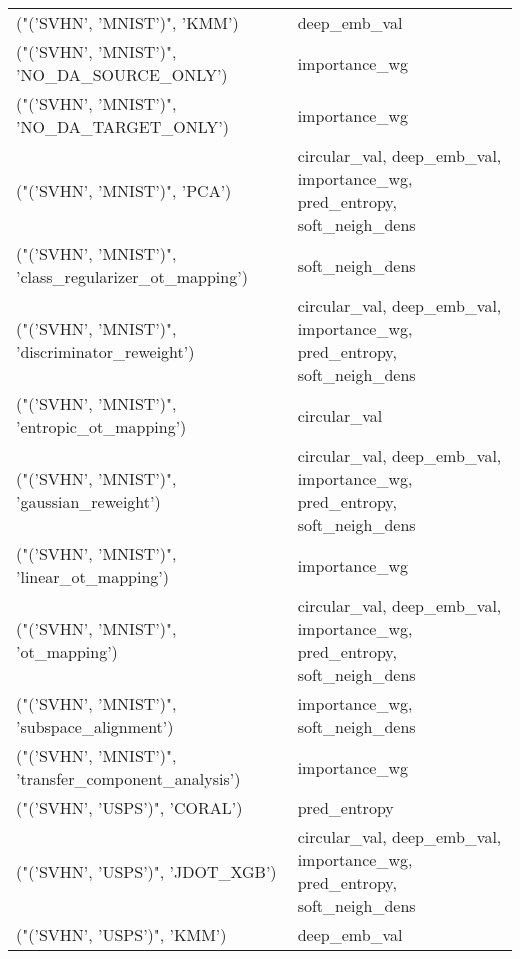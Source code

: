 \begin{tabular}{ll}
 ("('SVHN', 'MNIST')", 'KMM')                          & deep\_emb\_val                                                             \\
 ("('SVHN', 'MNIST')", 'NO\_DA\_SOURCE\_ONLY')            & importance\_wg                                                            \\
 ("('SVHN', 'MNIST')", 'NO\_DA\_TARGET\_ONLY')            & importance\_wg                                                            \\
 ("('SVHN', 'MNIST')", 'PCA')                          & circular\_val, deep\_emb\_val, importance\_wg, pred\_entropy, soft\_neigh\_dens \\
 ("('SVHN', 'MNIST')", 'class\_regularizer\_ot\_mapping') & soft\_neigh\_dens                                                          \\
 ("('SVHN', 'MNIST')", 'discriminator\_reweight')       & circular\_val, deep\_emb\_val, importance\_wg, pred\_entropy, soft\_neigh\_dens \\
 ("('SVHN', 'MNIST')", 'entropic\_ot\_mapping')          & circular\_val                                                             \\
 ("('SVHN', 'MNIST')", 'gaussian\_reweight')            & circular\_val, deep\_emb\_val, importance\_wg, pred\_entropy, soft\_neigh\_dens \\
 ("('SVHN', 'MNIST')", 'linear\_ot\_mapping')            & importance\_wg                                                            \\
 ("('SVHN', 'MNIST')", 'ot\_mapping')                   & circular\_val, deep\_emb\_val, importance\_wg, pred\_entropy, soft\_neigh\_dens \\
 ("('SVHN', 'MNIST')", 'subspace\_alignment')           & importance\_wg, soft\_neigh\_dens                                           \\
 ("('SVHN', 'MNIST')", 'transfer\_component\_analysis')  & importance\_wg                                                            \\
 ("('SVHN', 'USPS')", 'CORAL')                         & pred\_entropy                                                             \\
 ("('SVHN', 'USPS')", 'JDOT\_XGB')                      & circular\_val, deep\_emb\_val, importance\_wg, pred\_entropy, soft\_neigh\_dens \\
 ("('SVHN', 'USPS')", 'KMM')                           & deep\_emb\_val                                                             \\

\end{tabular}
